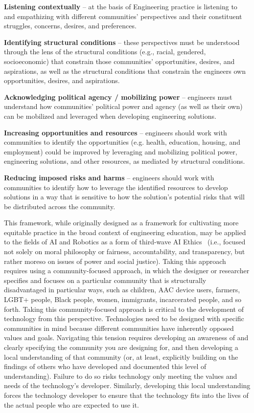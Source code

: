 \documentclass[letterpaper]{article} %
\begin{document}
\item \textbf{Listening contextually} -- at the basis of Engineering practice is listening to and empathizing with different communities' perspectives and their constituent struggles, concerns, desires, and preferences.
\item \textbf{Identifying structural conditions} -- these perspectives must be understood through the lens of the structural conditions (e.g., racial, gendered, socioeconomic) that constrain those communities' opportunities, desires, and aspirations, as well as the structural conditions that constrain the engineers own opportunities, desires, and aspirations.
\item \textbf{Acknowledging political agency / mobilizing power} -- engineers must understand how communities' political power and agency (as well as their own) can be mobilized and leveraged when developing engineering solutions.
\item \textbf{Increasing opportunities and resources} -- engineers should work with communities to identify the opportunities (e.g. health, education, housing, and employment) could be improved by leveraging and mobilizing political power, engineering solutions, and other resources, as mediated by structural conditions.
\item \textbf{Reducing imposed risks and harms} -- engineers should work with communities to identify how to leverage the identified resources to develop solutions in a way that is sensitive to how the solution's potential risks that will be distributed across the community.

This framework, while originally designed as a framework for cultivating more equitable practice in the broad context of engineering education, may be applied to the fields of AI and Robotics as a form of third-wave AI Ethics~\cite{bennett2020point,le2020we} (i.e., focused not solely on moral philosophy or fairness, accountability, and transparency, but rather moreso on issues of power and social justice). Taking this approach requires using a community-focused approach, in which the designer or researcher specifies and focuses on a particular community that is structurally disadvantaged in particular ways, such as children, AAC device users, farmers, LGBT+ people, Black people, women, immigrants, incarcerated people, and so forth. Taking this community-focused approach is critical to the development of technology from this perspective. Technologies need to be designed with specific communities in mind because different communities have inherently opposed values and goals. Navigating this tension requires developing an awareness of and clearly specifying the community you are designing for, and then developing a local understanding of that community (or, at least, explicitly building on the findings of others who have developed and documented this level of understanding). Failure to do so risks technology only meeting the values and needs of the technology's developer. Similarly, developing this local understanding forces the technology developer to ensure that the technology fits into the lives of the actual people who are expected to use it.
\end{document}
